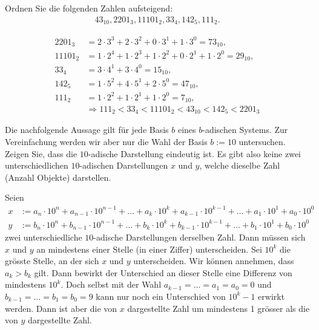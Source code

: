 \begin{myexercise}
	Ordnen Sie die folgenden Zahlen aufsteigend:
	\begin{align*}
		43_{10}, 2201_3, 11101_2, 33_4, 142_5, 111_2.
	\end{align*}
	\begin{myanswer}
		\begin{align*}
			2201_3  & = 2\cdot 3^3 + 2\cdot 3^2 + 0\cdot 3^1 + 1\cdot 3^0 = 73_{10},              \\
			11101_2 & = 1\cdot 2^4 + 1\cdot 2^3 + 1\cdot 2^2 + 0\cdot 2^1 + 1\cdot 2^0 = 29_{10}, \\
			33_4    & = 3\cdot 4^1 + 3\cdot 4^0 = 15_{10},                                        \\
			142_5   & = 1\cdot 5^2 + 4\cdot 5^1 + 2\cdot 5^0 = 47_{10},                           \\
			111_2   & = 1\cdot 2^2 + 1\cdot 2^1 + 1\cdot 2^0 = 7_{10},                            \\
			        & \Rightarrow 111_2 < 33_4 < 11101_2 < 43_{10} < 142_5 < 2201_3
		\end{align*}
	\end{myanswer}
\end{myexercise}

\begin{mychallenge}
	Die nachfolgende Aussage gilt für jede Basis $b$ eines $b$-adischen Systems. Zur Vereinfachung werden wir aber nur die Wahl der Basis $b := 10$ untersuchen.
	Zeigen Sie, dass die $10$-adische Darstellung eindeutig ist. Es gibt also keine zwei unterschiedlichen $10$-adischen Darstellungen $x$ und $y$, welche dieselbe Zahl (Anzahl Objekte) darstellen.
	\begin{myanswer}
		Seien
		\begin{align*}
			x & := a_n\cdot 10^n + a_{n-1}\cdot 10^{n-1} + \ldots + a_k\cdot 10^k + a_{k-1}\cdot 10^{k-1} + \ldots + a_1\cdot 10^1 + a_0\cdot 10^0 \\
			y & := b_n\cdot 10^n + b_{n-1}\cdot 10^{n-1} + \ldots + b_k\cdot 10^k + b_{k-1}\cdot 10^{k-1} + \ldots + b_1\cdot 10^1 + b_0\cdot 10^0
		\end{align*}
		zwei unterschiedliche $10$-adische Darstellungen derselben Zahl.
		Dann müssen sich $x$ und $y$ an mindestens einer Stelle (in einer Ziffer) unterscheiden.
		Sei $10^k$ die grösste Stelle, an der sich $x$ und $y$ unterscheiden. Wir können annehmen, dass $a_k > b_k$ gilt. Dann bewirkt der Unterschied an dieser Stelle
		eine Differenz von mindestens $10^k$. Doch selbst mit der Wahl $a_{k-1} = \ldots = a_1 = a_0 = 0$ und $b_{k-1} = \ldots = b_1 = b_0 = 9$ kann nur noch ein Unterschied von $10^k - 1$ erwirkt werden.
		Dann ist aber die von $x$ dargestellte Zahl um mindestens 1 grösser als die von $y$ dargestellte Zahl.
	\end{myanswer}
\end{mychallenge}

